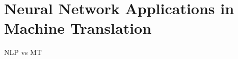 \section{Neural Network Applications in Machine Translation}
\label{sect:neural-network-applications-in-machine-translation}
NLP vs MT